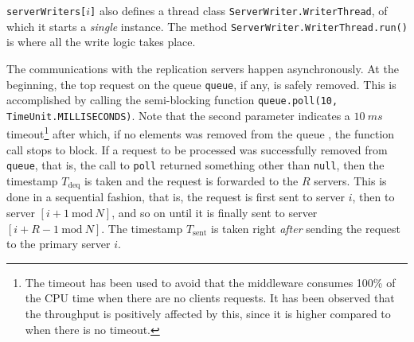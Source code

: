 \documentclass[11pt]{article}
\theoremstyle{definition}
\newcommand\Tdeq{T_{\mathrm{deq}}}
\newcommand\Tsent{T_{\mathrm{sent}}}
\renewcommand\t\texttt
\newcommand\md[2]{\left[#1\mathrm{\ mod\ }#2\right]}
\begin{document}
\t{serverWriters[$i$]} also defines a thread class \t{ServerWriter.WriterThread}, of which it starts a \emph{single} instance.
The method \t{ServerWriter.WriterThread.run()} is where all the write logic takes place.

The communications with the replication servers happen asynchronously.
At the beginning, the top request on the queue \t{queue}, if any, is safely removed.
This is accomplished by calling the semi-blocking function \t{queue.poll(10, TimeUnit.MILLISECONDS)}.
Note that the second parameter indicates a $10\ ms$ timeout\footnote{The timeout has been used to avoid that the middleware consumes 100\% of the CPU time when there are no clients requests. It has been observed that the throughput is positively affected by this, since it is higher compared to when there is no timeout.} %
after which, if no elements was removed from the queue%
, the function call stops to block.
If a request to be processed was successfully removed from \t{queue}, that is, the call to \t{poll} returned something other than \t{null}, then the timestamp $\Tdeq$ is taken and the request is forwarded to the $R$ servers.
This is done in a sequential fashion, that is, the request is first sent to server $i$, then to server $\md{i+1}N$, and so on until it is finally sent to server $\md{i+R-1}N$.
The timestamp $\Tsent$ is taken right \emph{after} sending the request to the primary server $i$.
\end{document}

